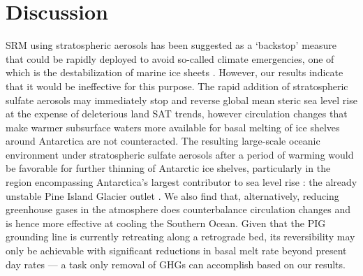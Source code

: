 \documentclass{nature}
\begin{document}

\section{Discussion}

SRM using stratospheric aerosols has been suggested as a `backstop' measure that could be rapidly deployed to avoid so-called climate emergencies, one of which is the destabilization of marine ice sheets \cite{blackstock09}. However, our results indicate that it would be ineffective for this purpose. The rapid addition of stratospheric sulfate aerosols may immediately stop and reverse global mean steric sea level rise at the expense of deleterious land SAT trends, however circulation changes that make warmer subsurface waters more available for basal melting of ice shelves around Antarctica are not counteracted. The resulting large-scale oceanic environment under stratospheric sulfate aerosols after a period of warming would be favorable for further thinning of Antarctic ice shelves, particularly in the region encompassing Antarctica's largest contributor to sea level rise \cite{shepherd12}: the already unstable Pine Island Glacier outlet \cite{rignot14}. We also find that, alternatively, reducing greenhouse gases in the atmosphere does counterbalance circulation changes and is hence more effective at cooling the Southern Ocean. Given that the PIG grounding line is currently retreating along a retrograde bed, its reversibility may only be achievable with significant reductions in basal melt rate beyond present day rates \cite{favier14} --- a task only removal of GHGs can accomplish based on our results.
\end{document}
